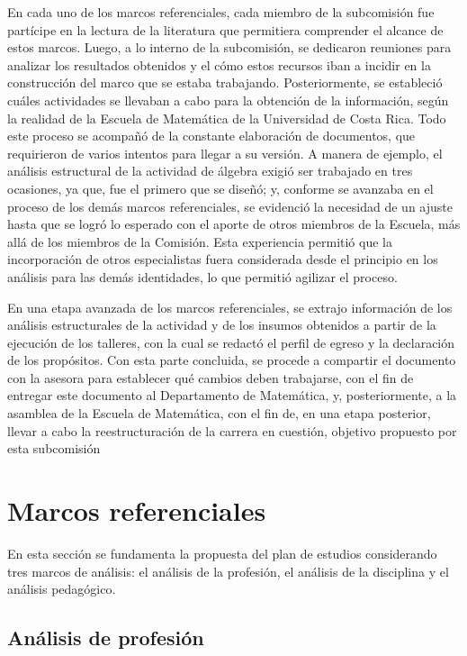 En cada uno de los marcos referenciales, cada miembro de la subcomisión fue partícipe en la lectura de la literatura que permitiera comprender el alcance de estos marcos. Luego, a lo interno de la subcomisión, se dedicaron reuniones para analizar los resultados obtenidos y el cómo estos recursos iban a incidir en la construcción del marco que se estaba trabajando. Posteriormente, se estableció cuáles actividades se llevaban a cabo para la obtención de la información, según la realidad de la Escuela de Matemática de la Universidad de Costa Rica. Todo este proceso se acompañó de la constante elaboración de documentos, que requirieron de varios intentos para llegar a su versión. A manera de ejemplo, el análisis estructural de la actividad de álgebra exigió ser trabajado en tres ocasiones, ya que, fue el primero que se diseñó; y, conforme se avanzaba en el proceso de los demás marcos referenciales, se evidenció la necesidad de un ajuste hasta que se logró lo esperado con el aporte de otros miembros de la Escuela, más allá de los miembros de la Comisión. Esta experiencia permitió que la incorporación de otros especialistas fuera considerada desde el principio en los análisis para las demás identidades, lo que permitió agilizar el proceso.

En una etapa avanzada de los marcos referenciales, se extrajo información de los análisis estructurales de la actividad y de los insumos obtenidos a partir de la ejecución de los talleres, con la cual se redactó el perfil de egreso y la declaración de los propósitos. Con esta parte concluida, se procede a compartir el documento con la asesora para establecer qué cambios deben trabajarse, con el fin de entregar este documento al Departamento de Matemática, y, posteriormente, a la asamblea de la Escuela de Matemática, con el fin de, en una etapa posterior, llevar a cabo la reestructuración de la carrera en cuestión, objetivo propuesto por esta subcomisión

\section{Marcos referenciales}

En esta sección se fundamenta la propuesta del plan de estudios considerando tres marcos de análisis: el análisis de la profesión, el análisis de la disciplina y el análisis pedagógico. 

\subsection{Análisis de profesión}

